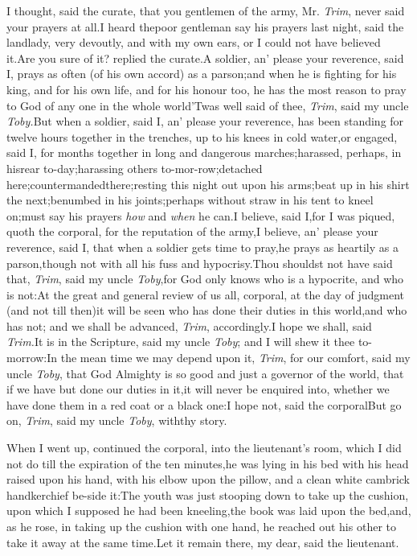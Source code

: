 \documentclass{article}
\begin{document}
I thought, said the curate, that you gentlemen of the army, Mr.
\textit{Trim}, never said your prayers at all.\tsh I heard
the\pb poor gentleman say his prayers last night, said the landlady,
very devoutly, and with my own ears, or I could not have believed
it.\tsh Are you sure of it? replied the
curate.\tsh A soldier, an’ please your reverence,
said I, prays as often (of his own accord) as a
parson;\break\tsh and when he is fighting for his king, and for
his own life, and for his honour too, he has the most reason to
pray to God of any one in the whole world\tsh ’Twas
well said of thee, \textit{Trim}, said my uncle
\textit{Toby.}\tsh But when a soldier, said I, an’
please your reverence, has been standing for twelve hours together
in the trenches, up to his knees in cold water,\tsk or engaged,
said I, for months together in long and dangerous
marches;\tsk harassed, perhaps, in his\break rear
to-day;\tsk harassing others to-mor-\break row;\tsk detached
here;\tsk countermanded\pb there;\tsk resting this night out upon
his arms;\tsk beat up in his shirt the next;\tsk benumbed in
his joints;\tsk perhaps without straw in his tent to kneel
on;\tsk must say his prayers \textit{how} and \textit{when} he
can.\tsk I believe, said I,\tsk for I was piqued, quoth the
corporal, for the reputation of the army,\tsk I believe,
an’ please your reverence, said I, that when a soldier gets
time to pray,\tsk he prays as heartily as a parson,\tsk though
not with all his fuss and hypocrisy.\tsh Thou shouldst not
have said that, \textit{Trim}, said my uncle \textit{Toby},\tsk for
God only knows who is a hypocrite, and who is not:\tsh At
the great and general review of us all, corporal, at the day of
judgment (and not till then)\tsk it will be seen who has done
their duties in this world,\tsk and who has not; and we shall be
advanced, \textit{Trim}, accordingly.\tsh I hope we shall,\pb
said \textit{Trim.}\tsh It is in the Scripture, said my
uncle \textit{Toby}; and I will shew it thee to-morrow:\tsh In the
mean time we may depend upon it, \textit{Trim}, for our comfort, said
my uncle \textit{Toby}, that God Almighty is so good and just a
governor of the world, that if we have but done our duties in
it,\tsh it will never be enquired into, whether we have done them
in a red coat or a black one:\tsh\break I hope not, said the
corporal\tsh But go on, \textit{Trim}, said my uncle
\textit{Toby}, with\break thy story.

When I went up, continued the corporal, into the
lieutenant’s room, which I did not do till the expiration of
the ten minutes,\tsk he was lying in his bed with his
head raised upon his hand, with his elbow upon the pillow, and a
clean white cambrick handkerchief be-\pb side it:\tsh The youth
was just stooping down to take up the cushion, upon which I
supposed he had been kneeling,\tsk the book was laid upon the
bed,\tsk and, as he rose, in taking up the cushion with one hand,
he reached out his other to take it away at the same
time.\tsh Let it remain there, my dear, said the
lieutenant.
\end{document}
